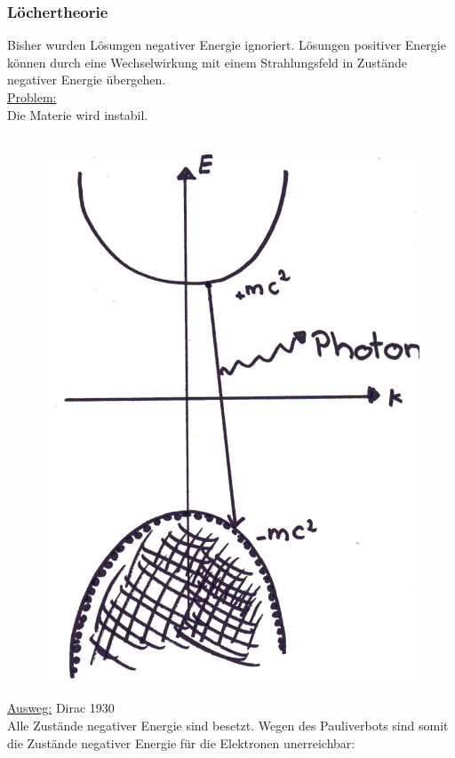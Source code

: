 \subsubsection{Löchertheorie}
Bisher wurden Lösungen negativer Energie ignoriert. Lösungen positiver Energie können durch eine Wechselwirkung mit einem Strahlungsfeld in Zustände negativer Energie übergehen.\\
\underline{Problem:}\\
Die Materie wird  instabil.\\
\\
\begin{figure}
\begin{center}
	\includegraphics[scale=0.15]{Figs/Pim000114.png}
\end{center}
\end{figure}
\underline{Ausweg:} Dirac 1930\\
Alle Zustände negativer Energie sind besetzt. Wegen des Pauliverbots sind somit die Zustände negativer Energie für die Elektronen unerreichbar:\\

